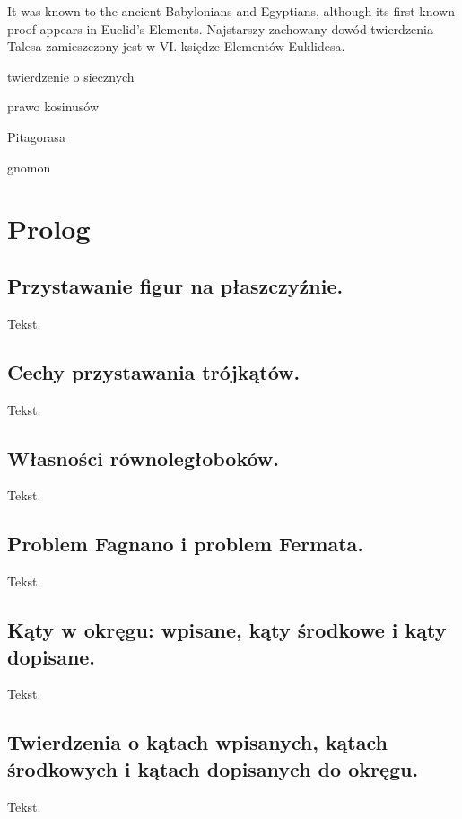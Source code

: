 \documentclass{parchment}
\begin{document}
It was known to the ancient Babylonians and Egyptians, although its first known proof appears in Euclid's Elements. 
Najstarszy zachowany dowód twierdzenia Talesa zamieszczony jest w VI. księdze Elementów Euklidesa. 


twierdzenie o siecznych

prawo kosinusów

Pitagorasa %

gnomon %

\chapter{Prolog}




\section{Przystawanie figur na płaszczyźnie.}
Tekst.

\section{Cechy przystawania trójkątów.}
Tekst.

\section{Własności równoległoboków.}
Tekst.

\section{Problem Fagnano i problem Fermata.}
Tekst.

\section{Kąty w okręgu: wpisane, kąty środkowe i kąty dopisane.}
Tekst.

\section{Twierdzenia o kątach wpisanych, kątach środkowych i kątach dopisanych do okręgu.}
Tekst.
\end{document}
